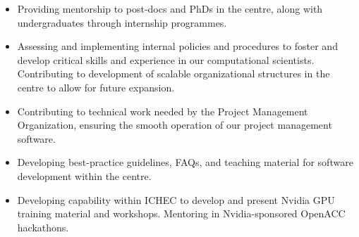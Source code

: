 \documentclass[11pt]{article}
\newenvironment{resumeSubSectionBody}{
    \par
    \vspace{-0.4\parskip}
    \begin{small}
    \par
} {
    \par
    \end{small}
    \par
}
\newenvironment{resumeItemize}{
    \vspace{-0.5\baselineskip}
    \begin{itemize}
} {
    \end{itemize}
}
\begin{document}
\begin{resumeSubSectionBody}
\begin{resumeItemize}
        \item
            Providing mentorship to post-docs and PhDs in the centre, along with
            undergraduates through internship programmes.

        \item
            Assessing and implementing internal policies and procedures to
            foster and develop critical skills and experience in our
            computational scientists.
            Contributing to development of scalable organizational structures in
            the centre to allow for future expansion.

        \item
            Contributing to technical work needed by the Project Management
            Organization, ensuring the smooth operation of our project
            management software.

        \item
            Developing best-practice guidelines, FAQs, and teaching material for
            software development within the centre.

        \item
            Developing capability within ICHEC to develop and present Nvidia GPU
            training material and workshops.
            Mentoring in Nvidia-sponsored OpenACC hackathons.
    \end{resumeItemize}
\end{resumeSubSectionBody}
\end{document}
